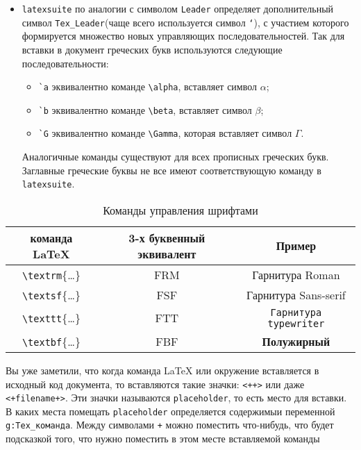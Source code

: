 \documentclass[a4paper]{article}
\begin{document}
\begin{itemize}
		которая не должны заменяться на соответствующую команду \LaTeX. Для этого нужно 
		ввести эту абревиатуру, она заменится на команду, после этого нужно нажать \texttt{u},
		то есть команду выполняющую отмену последнего действия, и в тексте останется 
		введенная абревиатура. 
	\item \texttt{latexsuite} по аналогии с символом \texttt{Leader} определяет
		дополнительный символ \verb|Tex_Leader|(чаще всего используется символ \texttt{`}),
		с участием которого формируется 
		множество новых управляющих последовательностей. Так для вставки в документ
		греческих букв используются следующие последовательности:
		\begin{itemize}
			\item \verb|`a| эквивалентно команде \verb|\alpha|, вставляет символ $\alpha$;
			\item \verb|`b| эквивалентно команде \verb|\beta|, вставляет символ $\beta$;
			\item \verb|`G| эквивалентно команде \verb|\Gamma|, которая вставляет символ $\Gamma$.
		\end{itemize}
		Аналогичные команды существуют для всех прописных греческих букв. Заглавные греческие
		буквы не все имеют соответствующую команду в \texttt{latexsuite}.
\end{itemize}
			\begin{table}
				\centering
				\begin{tabular}{|c|c|c|}
					\hline
					команда \LaTeX&3-х буквенный эквивалент&Пример\\
					\hline
					\verb|\textrm|\{\ldots\}&FRM&\textrm{Гарнитура Roman}\\
					\verb|\textsf|\{\ldots\}&FSF&\textsf{Гарнитура Sans-serif}\\
					\verb|\texttt|\{\ldots\}&FTT&\texttt{Гарнитура typewriter}\\
					\verb|\textbf|\{\ldots\}&FBF&\textbf{Полужирный}\\
					\hline
				\end{tabular}
				\caption{Команды управления шрифтами}
				\label{tab:fonts}
			\end{table}
Вы уже заметили, что когда команда \LaTeX{} или окружение вставляется в исходный код документа, 
то вставляются такие значки: \verb|<++>| или даже \verb|<+filename+>|. Эти значки называются 
\texttt{placeholder}, то есть место для вставки. В каких места помещать \texttt{placeholder}
определяется содержимыи переменной \verb|g:Tex_команда|. Между символами \texttt{+} можно поместить
что-нибудь, что будет подсказкой того, что нужно поместить в этом месте вставляемой команды
\end{document}
